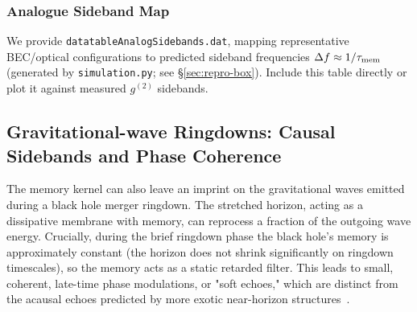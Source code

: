 \documentclass[aps,prd,preprint,onecolumn,superscriptaddress,nofootinbib,longbibliography,floatfix,11pt,showpacs,showkeys]{revtex4-2}
\theoremstyle{plain}
\theoremstyle{definition}
\theoremstyle{remark}
\begin{document}
\subsubsection{Analogue Sideband Map}
We provide \texttt{datatableAnalogSidebands.dat}, mapping representative BEC/optical
configurations to predicted sideband frequencies $\Delta f\approx 1/\tau_{\rm mem}$ (generated
by \texttt{simulation.py}; see \S\ref{sec:repro-box}). Include this table directly or plot it
against measured $g^{(2)}$ sidebands.


\subsection{Gravitational-wave Ringdowns: Causal Sidebands and Phase Coherence}
The memory kernel can also leave an imprint on the gravitational waves emitted during a black hole merger ringdown. The stretched horizon, acting as a dissipative membrane with memory, can reprocess a fraction of the outgoing wave energy. Crucially, during the brief ringdown phase the black hole's memory is approximately constant (the horizon does not shrink significantly on ringdown timescales), so the memory acts as a static retarded filter. This leads to small, coherent, late-time phase modulations, or "soft echoes," which are distinct from the acausal echoes predicted by more exotic near-horizon structures~\cite{Cardoso:2016, Abedi:2017}.
\end{document}

